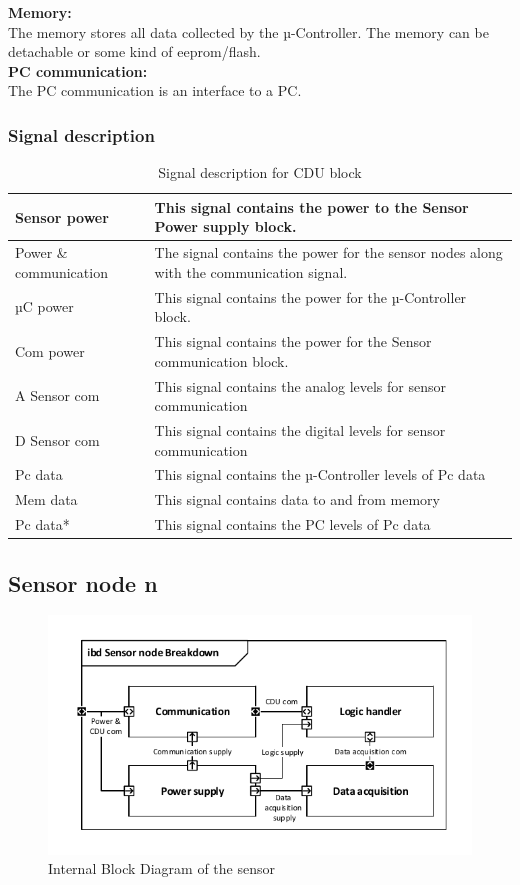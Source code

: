 \textbf{Memory:}\\
The memory stores all data collected by the µ-Controller. The memory can be detachable or some kind of eeprom/flash.\\

\textbf{PC communication:}\\
The PC communication is an interface to a PC.\\

\subsubsection{Signal description}
\begin{table}[H]
	\centering
    \begin{tabular}{|l|p{9cm}|}
    \hline
    Sensor power & This signal contains the power to the Sensor Power supply block. \\
    \hline
    Power \& communication & The signal contains the power for the sensor nodes along with the communication signal. \\
    \hline
    µC power & This signal contains the power for the µ-Controller block. \\
    \hline
    Com power & This signal contains the power for the Sensor communication block. \\
    \hline
    A Sensor com & This signal contains the analog levels for sensor communication \\
    \hline
    D Sensor com & This signal contains the digital levels for sensor communication \\
    \hline
    Pc data & This signal contains the µ-Controller levels of Pc data \\
    \hline
    Mem data & This signal contains data to and from memory \\
    \hline
    Pc data* & This signal contains the PC levels of Pc data \\
    \hline
    \end{tabular}
    \caption{Signal description for CDU block}
    \label{CDUsignaldes}
\end{table}

\subsection{Sensor node n}

\begin{figure}[hbpt]
\centering
\includegraphics[width=.8\textwidth]{billeder/Sensor_IBD}
\caption{Internal Block Diagram of the sensor}
\label{Sensor_IBD}
\end{figure}

